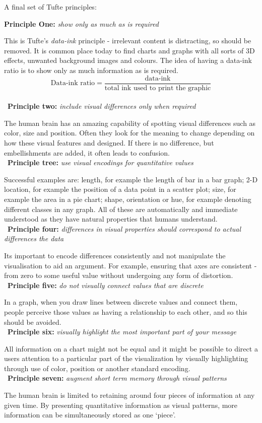 \documentclass[a4paper,11pt,titlepage]{article}
\begin{document}
		A final set of Tufte \cite{Tufte2001} principles:
		\par
		\textbf{Principle One:} \textit{show only as much as is required}
		\par 
		This is Tufte's \textit{data-ink} principle - irrelevant content is distracting, so should be removed. It is common place today to find charts and graphs with all sorts of 3D effects, unwanted background images and colours. The idea of having a data-ink ratio is to show only as much information as is required.
		$$
		\text{Data-ink ratio} = 
		\frac{\text{data-ink}}{\text{total ink used to print the graphic}}
		$$
		\\\
		\textbf{Principle two:} \textit{include visual differences only when required} 
		\par
		The human brain has an amazing capability of spotting visual differences such as color, size and position. Often they look for the meaning to change depending on how these visual features and designed. If there is no difference, but embellishments are added, it often leads to confusion.
		\\\ 
		\textbf{Principle tree:} \textit{use visual encodings for quantitative values}
		\par 
		Successful examples are: length, for example the length of bar in a bar graph; 2-D location, for example the position of a data point in a scatter plot; size, for example the area in a pie chart; shape, orientation or hue, for example denoting different classes in any graph. All of these are automatically and immediate understood as they have natural properties that humans understand. 
		\\\
		\textbf{Principle four:} \textit{differences in visual properties should correspond to actual differences the data}
		\par 
		Its important to encode differences consistently and not manipulate the visualisation to aid an argument. For example, ensuring that axes are consistent - from zero to some useful value without undergoing any form of distortion.
		\\\
		\textbf{Principle five:} \textit{do not visually connect values that are discrete}
		\par 
		In a graph, when you draw lines between discrete values and connect them, people perceive those values as having a relationship to each other, and so this should be avoided.
		\\\
		\textbf{Principle six:} \textit{visually highlight the most important part of your message}
		\par 
		All information on a chart might not be equal and it might be possible to direct a users attention to a particular part of the visualization by visually highlighting through use of color, position or another standard encoding.
		\\\
		\textbf{Principle seven:} \textit{augment short term memory through visual patterns}
		\par 
		The human brain is limited to retaining around four pieces of information at any given time. By presenting quantitative information as visual patterns, more information can be simultaneously stored as one `piece'.
		
\end{document}
